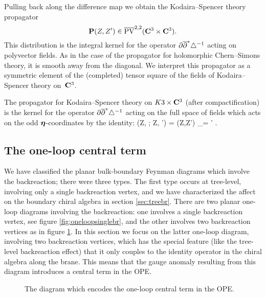 \documentclass[../main.tex]{subfiles}
\begin{document}
Pulling back along the difference map we obtain the Kodaira--Spencer theory propagator
\[
\mathbf{P} (Z,Z') \in \overline{{\rm PV}}^{2,2}(\mathbf{C}^3 \times \mathbf{C}^3) .
\]
This distribution is the integral kernel for the operator $\partial \overline{\partial}^* \triangle^{-1}$ acting on polyvector fields. 
As in the case of the propagator for holomorphic Chern--Simons theory, it is smooth away from the diagonal. 
We interpret this propagator as a symmetric element of the (completed) tensor square of the fields of Kodaira--Spencer theory on~$\mathbf{C}^3$. 

The propagator for Kodaira--Spencer theory on $K3 \times \mathbf{C}^3$ (after compactification) is the kernel for the operator $\partial \overline{\partial}^* \triangle^{-1}$ acting on the full space of fields which acts on the odd $\boldsymbol\eta$-coordinates by the identity:
\beqn
\bP(Z, \bfeta ; Z, \bfeta') = \bP(Z,Z') \delta_{\bfeta = \bfeta'} .
\eeqn

\subsection{The one-loop central term} 
\label{sec:oneloop}

We have classified the planar bulk-boundary Feynman diagrams which involve the backreaction; there were three types.
The first type occurs at tree-level, involving only a single backreaction vertex, and we have characterized the affect on the boundary chiral algebra in section \ref{sec:treebr}.
There are two planar one-loop diagrams involving the backreaction: one involves a single backreaction vertex, see figure \ref{fig:oneloopsinglebr}, and the other involves two backreaction vertices as in figure \ref{fig:orderN}.
In this section we focus on the latter one-loop diagram, involving two backreaction vertices, which has the special feature (like the tree-level backreaction effect) that it only couples to the identity operator in the chiral algebra along the brane. This means that the gauge anomaly resulting from this diagram introduces a central term in the OPE.

\begin{figure}
	\label{fig:orderN}
	\caption{The diagram which encodes the one-loop central term in the OPE.}  
\end{figure}
\end{document}
